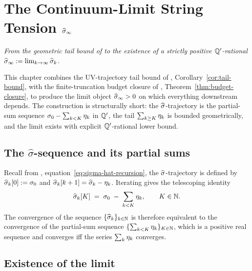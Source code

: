 %

\chapter{The Continuum-Limit String Tension
  \texorpdfstring{$\widehat{\sigma}_\infty$}{sigma\_infty}}
\label{ch:continuum-limit}

\noindent\emph{From the geometric tail bound of
 to the existence of a strictly positive
$\mathbb{Q}'$-rational $\widehat{\sigma}_\infty := \lim_{k \to \infty} \widehat{\sigma}_k$.}

This chapter combines the UV-trajectory tail bound of
,
Corollary~\ref{cor:tail-bound}, with the finite-truncation budget
closure of ,
Theorem~\ref{thm:budget-closure}, to produce the limit object
$\widehat{\sigma}_\infty > 0$ on which everything downstream depends.  The
construction is structurally short: the $\widehat{\sigma}$-trajectory is the
partial-sum sequence $\sigma_0 - \sum_{k < K} \eta_k$ in $\mathbb{Q}'$, the
tail $\sum_{k \ge K} \eta_k$ is bounded geometrically, and the limit
exists with explicit $\mathbb{Q}'$-rational lower bound.

\section{The $\widehat\sigma$-sequence and its partial sums}
\label{sec:sigma-sequence}

%

Recall from ,
equation~\eqref{eq:sigma-hat-recursion}, the $\widehat{\sigma}$-trajectory is
defined by $\widehat{\sigma}_k[0] := \sigma_0$ and $\widehat{\sigma}_k[k+1] = \widehat{\sigma}_k - \eta_k$.
Iterating gives the telescoping identity
\begin{equation}
  \label{eq:sigh-telescope}
  \widehat{\sigma}_k[K] \;=\; \sigma_0 \;-\; \sum_{k < K} \eta_k ,
  \qquad K \in \mathbb{N}.
\end{equation}
The convergence of the sequence $\{\widehat{\sigma}_k\}_{k \in \mathbb{N}}$ is
therefore equivalent to the convergence of the partial-sum sequence
$\{\sum_{k < K} \eta_k\}_{K \in \mathbb{N}}$, which is a positive
real sequence and converges iff the series $\sum_k \eta_k$ converges.

\section{Existence of the limit}
\label{sec:limit-existence}

